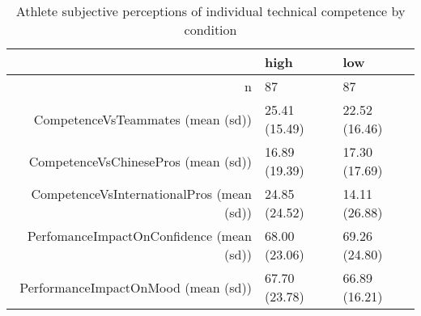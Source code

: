 \begin{table}[ht]
\centering
\begin{tabular}{rll}
  \hline
 & high & low \\ 
  \hline
n &    87 &    87 \\ 
  CompetenceVsTeammates (mean (sd)) & 25.41 (15.49) & 22.52 (16.46) \\ 
  CompetenceVsChinesePros (mean (sd)) & 16.89 (19.39) & 17.30 (17.69) \\ 
  CompetenceVsInternationalPros (mean (sd)) & 24.85 (24.52) & 14.11 (26.88) \\ 
  PerfomanceImpactOnConfidence (mean (sd)) & 68.00 (23.06) & 69.26 (24.80) \\ 
  PerformanceImpactOnMood (mean (sd)) & 67.70 (23.78) & 66.89 (16.21) \\ 
   \hline
\end{tabular}
\caption{Athlete subjective perceptions of 
 individual technical competence by condition} 
\label{tab:indPerfTimeHighTraining}
\end{table}
